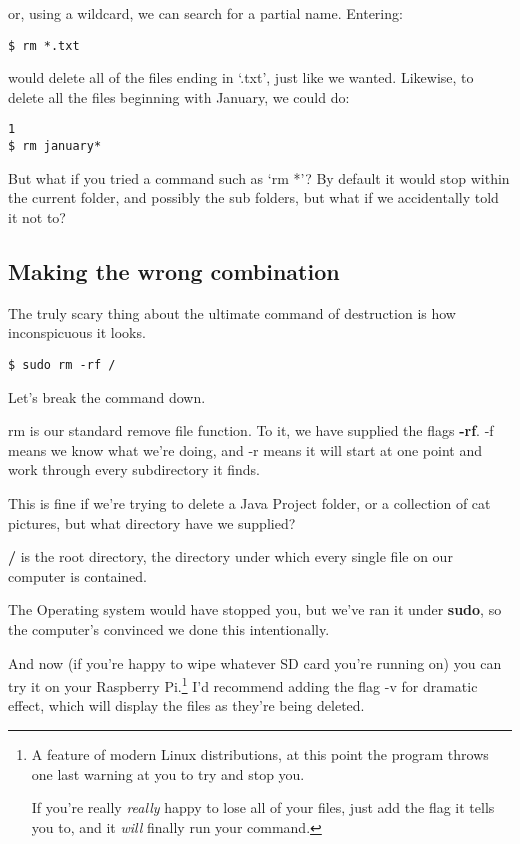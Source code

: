 		or, using a wildcard, we can search for a partial name. Entering:
		\begin{lstlisting}[style=Terminal]
$ rm *.txt
		\end{lstlisting}

		would delete all of the files ending in `.txt', just like we wanted. Likewise, to delete all the files beginning with January, we could do:
		\begin{lstlisting}[style=Terminal]1
$ rm january*
		\end{lstlisting}
	
		But what if you tried a command such as `rm *'? By default it would stop within the current folder, and possibly the sub folders, but what if we accidentally told it not to?
	
	\subsection{Making the wrong combination}
	
	The truly scary thing about the ultimate command of destruction is how inconspicuous it looks.
	
		\begin{lstlisting}[style=Terminal]
$ sudo rm -rf /
		\end{lstlisting}

		Let's break the command down.
		
		rm is our standard remove file function. To it, we have supplied the flags \textbf{-rf}. -f means we know what we're doing, and -r means it will start at one point and work through every subdirectory it finds.
		
		This is fine if we're trying to delete a Java Project folder, or a collection of cat pictures, but what directory have we supplied?
		
		\textbf{/} is the root directory, the directory under which every single file on our computer is contained.
		
		The Operating system would have stopped you, but we've ran it under \textbf{sudo}, so the computer's convinced we done this intentionally.
		
		And now (if you're happy to wipe whatever SD card you're running on) you can try it on your Raspberry Pi.\footnote{A feature of modern Linux distributions, at this point the program throws one last warning at you to try and stop you.
			
		If you're really \textit{really} happy to lose all of your files, just add the flag it tells you to, and it \textit{will} finally run your command.} I'd recommend adding the flag -v for dramatic effect, which will display the files as they're being deleted.
	
